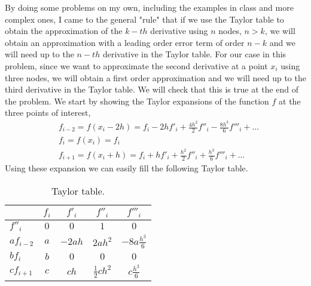 \begin{solution}
By doing some problems on my own, including the examples in class and more complex ones, I came to the general "rule" that if we use the Taylor table to obtain the approximation of the $k-th$ derivative using $n$ nodes, $n>k$, we will obtain an approximation with a leading order error term of order $n-k$ and we will need up to the $n-th$ derivative in the Taylor table. For our case in this problem, since we want to approximate the second derivative at a point $x_i$ using three nodes, we will obtain a first order approximation and we will need up to the third derivative in the Taylor table. We will check that this is true at the end of the problem.
We start by showing the Taylor expansions of the function $f$ at the three points of interest,
\begin{align*}
&f_{i-2}=f(x_i-2h)=f_i-2hf'_i+\frac{4h^2}{2}f''_i-\frac{8h^3}{6}f'''_i+...\\
&f_{i}=f(x_i)=f_i\\
&f_{i+1}=f(x_i+h)=f_i+hf'_i+\frac{h^2}{2}f''_i+\frac{h^3}{6}f'''_i+...
\end{align*}
Using these expansion we can easily fill the following Taylor table.

\begin{table}[H]
\centering
\begin{tabular}{l|c c c c }
  & $f_i$ & $f'_i$ & $f''_i$ & $f'''_i$\\
\hline
$f''_i$ & $0$ & $0$ & $1$ & $0$\\
$af_{i-2}$ & $a$ & $-2ah$ & $2ah^2$ & $-8a\frac{h^3}{6}$\\
$bf_i$ & $b$ & $0$ & $0$ & $0$\\
$cf_{i+1}$ & $c$ & $ch$ & $\frac{1}{2}ch^2$ & $c\frac{h^3}{6}$\\
\end{tabular}
\caption{Taylor table.}
\end{table}


\end{solution}
